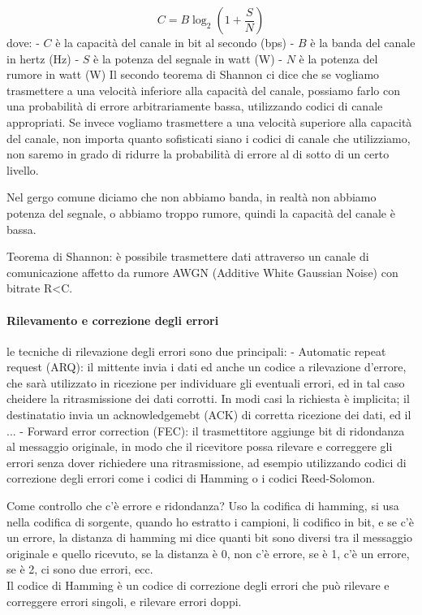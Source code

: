 $$C = B \log_2 (1 + \frac{S}{N})$$
dove:
- $C$ è la capacità del canale in bit al secondo (bps)
- $B$ è la banda del canale in hertz (Hz)
- $S$ è la potenza del segnale in watt (W)
- $N$ è la potenza del rumore in watt (W)
Il secondo teorema di Shannon ci dice che se vogliamo trasmettere a una velocità 
inferiore alla capacità del canale, possiamo farlo con una probabilità di errore 
arbitrariamente bassa, utilizzando codici di canale appropriati. 
Se invece vogliamo trasmettere a una velocità superiore alla capacità del canale, 
non importa quanto sofisticati siano i codici di canale che utilizziamo, non saremo 
in grado di ridurre la probabilità di errore al di sotto di un certo livello.

Nel gergo comune diciamo che non abbiamo banda, in realtà non abbiamo potenza del 
segnale, o abbiamo troppo rumore, quindi la capacità del canale è bassa. 

Teorema di Shannon: è possibile trasmettere dati attraverso un canale di comunicazione
affetto da rumore AWGN (Additive White Gaussian Noise) con bitrate R<C.

\paragraph{Rilevamento e correzione degli errori}
le tecniche di rilevazione degli errori sono due principali:
- Automatic repeat request (ARQ): il mittente invia i dati ed anche un codice a rilevazione
d'errore, che sarà utilizzato in ricezione per individuare gli eventuali errori, ed in 
tal caso cheidere la ritrasmissione dei dati corrotti. In modi casi la richiesta è
implicita; il destinatatio invia un acknowledgemebt (ACK) di corretta ricezione dei dati, 
ed il ...
- Forward error correction (FEC): il trasmettitore aggiunge bit di ridondanza al 
messaggio originale, in modo che il ricevitore possa rilevare e correggere gli errori 
senza dover richiedere una ritrasmissione, ad esempio utilizzando codici di correzione 
degli errori come i codici di Hamming o i codici Reed-Solomon.

Come controllo che c'è errore e ridondanza? 
Uso la codifica di hamming, si usa nella codifica di sorgente, quando ho estratto i campioni,
li codifico in bit, e se c'è un errore, la distanza di hamming mi dice quanti bit sono 
diversi tra il messaggio originale e quello ricevuto, se la distanza è 0, non c'è errore, 
se è 1, c'è un errore, se è 2, ci sono due errori, ecc.\\

Il codice di Hamming è un codice di correzione degli errori che può rilevare e 
correggere errori singoli, e rilevare errori doppi.\\

